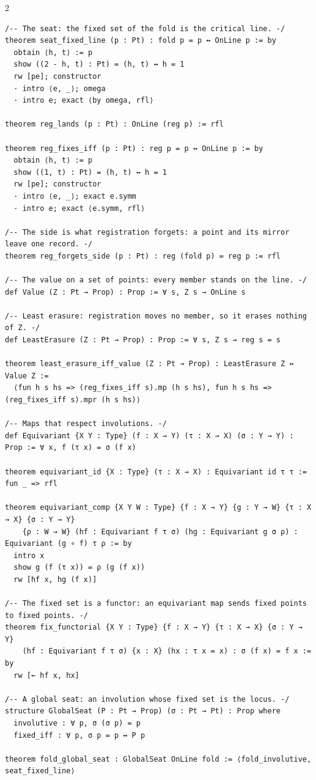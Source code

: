 \documentclass[10pt]{article}
\begin{document}
\begin{multicols}{2}
\begin{Verbatim}[fontsize=\fontsize{5.9}{6.8}\selectfont,breaklines,breakanywhere,breaksymbolleft={}]
/-- The seat: the fixed set of the fold is the critical line. -/
theorem seat_fixed_line (p : Pt) : fold p = p ↔ OnLine p := by
  obtain ⟨h, t⟩ := p
  show ((2 - h, t) : Pt) = (h, t) ↔ h = 1
  rw [pe]; constructor
  · intro ⟨e, _⟩; omega
  · intro e; exact ⟨by omega, rfl⟩

theorem reg_lands (p : Pt) : OnLine (reg p) := rfl

theorem reg_fixes_iff (p : Pt) : reg p = p ↔ OnLine p := by
  obtain ⟨h, t⟩ := p
  show ((1, t) : Pt) = (h, t) ↔ h = 1
  rw [pe]; constructor
  · intro ⟨e, _⟩; exact e.symm
  · intro e; exact ⟨e.symm, rfl⟩

/-- The side is what registration forgets: a point and its mirror leave one record. -/
theorem reg_forgets_side (p : Pt) : reg (fold p) = reg p := rfl

/-- The value on a set of points: every member stands on the line. -/
def Value (Z : Pt → Prop) : Prop := ∀ s, Z s → OnLine s

/-- Least erasure: registration moves no member, so it erases nothing of Z. -/
def LeastErasure (Z : Pt → Prop) : Prop := ∀ s, Z s → reg s = s

theorem least_erasure_iff_value (Z : Pt → Prop) : LeastErasure Z ↔ Value Z :=
  ⟨fun h s hs => (reg_fixes_iff s).mp (h s hs), fun h s hs => (reg_fixes_iff s).mpr (h s hs)⟩

/-- Maps that respect involutions. -/
def Equivariant {X Y : Type} (f : X → Y) (τ : X → X) (σ : Y → Y) : Prop := ∀ x, f (τ x) = σ (f x)

theorem equivariant_id {X : Type} (τ : X → X) : Equivariant id τ τ := fun _ => rfl

theorem equivariant_comp {X Y W : Type} {f : X → Y} {g : Y → W} {τ : X → X} {σ : Y → Y}
    {ρ : W → W} (hf : Equivariant f τ σ) (hg : Equivariant g σ ρ) : Equivariant (g ∘ f) τ ρ := by
  intro x
  show g (f (τ x)) = ρ (g (f x))
  rw [hf x, hg (f x)]

/-- The fixed set is a functor: an equivariant map sends fixed points to fixed points. -/
theorem fix_functorial {X Y : Type} {f : X → Y} {τ : X → X} {σ : Y → Y}
    (hf : Equivariant f τ σ) {x : X} (hx : τ x = x) : σ (f x) = f x := by
  rw [← hf x, hx]

/-- A global seat: an involution whose fixed set is the locus. -/
structure GlobalSeat (P : Pt → Prop) (σ : Pt → Pt) : Prop where
  involutive : ∀ p, σ (σ p) = p
  fixed_iff : ∀ p, σ p = p ↔ P p

theorem fold_global_seat : GlobalSeat OnLine fold := ⟨fold_involutive, seat_fixed_line⟩


\end{Verbatim}
\end{multicols}
\end{document}
